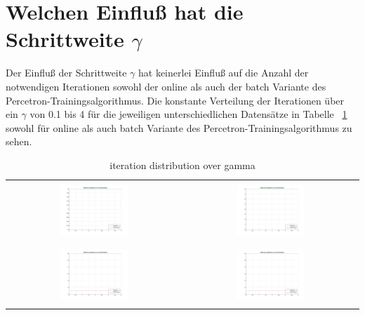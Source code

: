 \documentclass[]{report}
\begin{document}
\section{Welchen Einflu{\ss} hat die Schrittweite $\gamma$}

Der Einflu{\ss} der Schrittweite $\gamma$ hat keinerlei Einflu{\ss} auf die Anzahl der notwendigen Iterationen sowohl der online als auch der batch Variante des Percetron-Trainingsalgorithmus. Die konstante Verteilung der Iterationen \"uber ein $\gamma$ von 0.1 bis 4 f\"ur die jeweiligen unterschiedlichen Datens\"atze in Tabelle ~\ref{tab:GammaToIterations} sowohl f\"ur online als auch batch Variante des Percetron-Trainingsalgorithmus zu sehen.

\begin{table}[h]
\begin{tabular}{| c | c |}
\hline
 & \\
\includegraphics[width=0.4\textwidth]{./images/GammaToIterations_0150.jpg} & \includegraphics[width=0.4\textwidth]{./images/GammaToIterations_0250.jpg} \\
 & \\
\hline
 & \\
\includegraphics[width=0.4\textwidth]{./images/GammaToIterations_0350.jpg} & \includegraphics[width=0.4\textwidth]{./images/GammaToIterations_0450.jpg} \\
 & \\
\hline
\end{tabular}
\caption{iteration distribution over gamma}
\label{tab:GammaToIterations}
\end{table}
\end{document}
